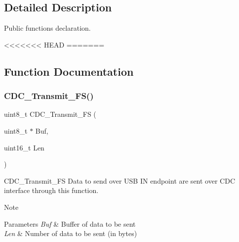 \subsection{Detailed Description}
Public functions declaration. 

<<<<<<< HEAD
=======


\subsection{Function Documentation}
\mbox{\label{group___u_s_b_d___c_d_c___i_f___exported___functions_prototype_ga5137d6201dbdef2bf351c5b4941c24f4}} 
\subsubsection{\texorpdfstring{C\+D\+C\+\_\+\+Transmit\+\_\+\+F\+S()}{CDC\_Transmit\_FS()}}
{\footnotesize\ttfamily uint8\+\_\+t C\+D\+C\+\_\+\+Transmit\+\_\+\+FS (\begin{DoxyParamCaption}\item[{uint8\+\_\+t $\ast$}]{Buf,  }\item[{uint16\+\_\+t}]{Len }\end{DoxyParamCaption})}



C\+D\+C\+\_\+\+Transmit\+\_\+\+FS Data to send over U\+SB IN endpoint are sent over C\+DC interface through this function. 

\begin{DoxyNote}{Note}

\end{DoxyNote}

\begin{DoxyParams}{Parameters}
{\em Buf} & Buffer of data to be sent \\
\hline
{\em Len} & Number of data to be sent (in bytes) \\
\hline
\end{DoxyParams}

